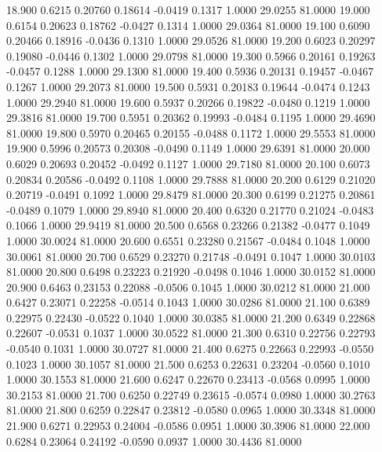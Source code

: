   18.900   0.6215   0.20760   0.18614  -0.0419   0.1317   1.0000  29.0255  81.0000
  19.000   0.6154   0.20623   0.18762  -0.0427   0.1314   1.0000  29.0364  81.0000
  19.100   0.6090   0.20466   0.18916  -0.0436   0.1310   1.0000  29.0526  81.0000
  19.200   0.6023   0.20297   0.19080  -0.0446   0.1302   1.0000  29.0798  81.0000
  19.300   0.5966   0.20161   0.19263  -0.0457   0.1288   1.0000  29.1300  81.0000
  19.400   0.5936   0.20131   0.19457  -0.0467   0.1267   1.0000  29.2073  81.0000
  19.500   0.5931   0.20183   0.19644  -0.0474   0.1243   1.0000  29.2940  81.0000
  19.600   0.5937   0.20266   0.19822  -0.0480   0.1219   1.0000  29.3816  81.0000
  19.700   0.5951   0.20362   0.19993  -0.0484   0.1195   1.0000  29.4690  81.0000
  19.800   0.5970   0.20465   0.20155  -0.0488   0.1172   1.0000  29.5553  81.0000
  19.900   0.5996   0.20573   0.20308  -0.0490   0.1149   1.0000  29.6391  81.0000
  20.000   0.6029   0.20693   0.20452  -0.0492   0.1127   1.0000  29.7180  81.0000
  20.100   0.6073   0.20834   0.20586  -0.0492   0.1108   1.0000  29.7888  81.0000
  20.200   0.6129   0.21020   0.20719  -0.0491   0.1092   1.0000  29.8479  81.0000
  20.300   0.6199   0.21275   0.20861  -0.0489   0.1079   1.0000  29.8940  81.0000
  20.400   0.6320   0.21770   0.21024  -0.0483   0.1066   1.0000  29.9419  81.0000
  20.500   0.6568   0.23266   0.21382  -0.0477   0.1049   1.0000  30.0024  81.0000
  20.600   0.6551   0.23280   0.21567  -0.0484   0.1048   1.0000  30.0061  81.0000
  20.700   0.6529   0.23270   0.21748  -0.0491   0.1047   1.0000  30.0103  81.0000
  20.800   0.6498   0.23223   0.21920  -0.0498   0.1046   1.0000  30.0152  81.0000
  20.900   0.6463   0.23153   0.22088  -0.0506   0.1045   1.0000  30.0212  81.0000
  21.000   0.6427   0.23071   0.22258  -0.0514   0.1043   1.0000  30.0286  81.0000
  21.100   0.6389   0.22975   0.22430  -0.0522   0.1040   1.0000  30.0385  81.0000
  21.200   0.6349   0.22868   0.22607  -0.0531   0.1037   1.0000  30.0522  81.0000
  21.300   0.6310   0.22756   0.22793  -0.0540   0.1031   1.0000  30.0727  81.0000
  21.400   0.6275   0.22663   0.22993  -0.0550   0.1023   1.0000  30.1057  81.0000
  21.500   0.6253   0.22631   0.23204  -0.0560   0.1010   1.0000  30.1553  81.0000
  21.600   0.6247   0.22670   0.23413  -0.0568   0.0995   1.0000  30.2153  81.0000
  21.700   0.6250   0.22749   0.23615  -0.0574   0.0980   1.0000  30.2763  81.0000
  21.800   0.6259   0.22847   0.23812  -0.0580   0.0965   1.0000  30.3348  81.0000
  21.900   0.6271   0.22953   0.24004  -0.0586   0.0951   1.0000  30.3906  81.0000
  22.000   0.6284   0.23064   0.24192  -0.0590   0.0937   1.0000  30.4436  81.0000
